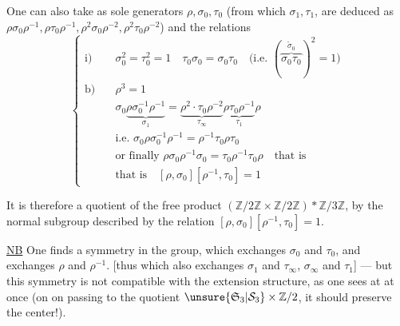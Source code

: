 One can also take as sole generators $\rho,\sigma_0,\tau_0$ (from which $\sigma_1,\tau_1$, \inserted{$\sigma_\infty,\tau_\infty$,} are deduced as $\rho\sigma_0\rho^{-1},\rho\tau_0\rho^{-1},\rho^2\sigma_0\rho^{-2},\rho^2\tau_0\rho^{-2}$) and the relations
\[
\left\{\begin{aligned}
\text{i)}\quad&\sigma_0^2=\tau_0^2=1\quad\tau_0\sigma_0=\sigma_0\tau_0\quad\text{(i.e. }(\overbrace{\sigma_0\tau_0}^{\tilde\sigma_0})^2=1\text{)}\\
\text{b)}\quad&\rho^3=1\\
&\sigma_0\underbrace{\rho\sigma_0^{-1}\rho^{-1}}_{\sigma_1}=\underbrace{\rho^2\cdot\tau_0\rho^{-2}}_{\tau_\infty}\underbrace{\rho\tau_0\rho^{-1}}_{\tau_1}\rho\\
&\text{i.e. }\sigma_0\rho\sigma_0^{-1}\rho^{-1}=\rho^{-1}\tau_0\rho\tau_0\\
&\text{or finally }\rho\sigma_0\rho^{-1}\sigma_0=\tau_0\rho^{-1}\tau_0\rho\quad\text{that is}\\
&\text{that is}\quad[\rho,\sigma_0][\rho^{-1},\tau_0]=1
\end{aligned}\right.
\]

It is therefore a quotient of the free product $(\mathbb Z/2\mathbb Z\times\mathbb Z/2\mathbb Z)*\mathbb Z/3\mathbb Z$, by the normal subgroup described by the relation $[\rho,\sigma_0][\rho^{-1},\tau_0]=1$.

\uline{NB} One finds a symmetry in the group, which exchanges $\sigma_0$ and $\tau_0$, and exchanges $\rho$ and $\rho^{-1}$. [thus which also exchanges $\sigma_1$ and $\tau_\infty$, $\sigma_\infty$ and $\tau_1$] --- but this symmetry is not compatible with the extension structure, as one sees at  at once (on\unsure{:|;} on passing to the quotient $\unsure{\mathfrak S_3|\mathcal S_3}\times\mathbb Z/2$, it should preserve the center!).
